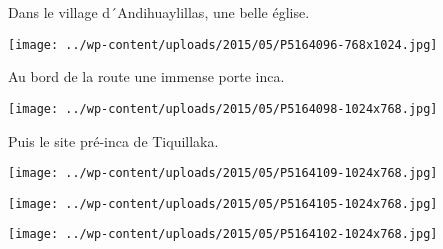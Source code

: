  \newline
 Dans le village d´Andihuaylillas, une belle église. \newline
 \newline
\centerline{\texttt{[image: ../wp-content/uploads/2015/05/P5164096-768x1024.jpg]} } 
 \newline
 Au bord de la route une immense porte inca. \newline
 \newline
\centerline{\texttt{[image: ../wp-content/uploads/2015/05/P5164098-1024x768.jpg]} } 
 \newline
 Puis le site pré-inca de Tiquillaka. \newline
 \newline
\centerline{\texttt{[image: ../wp-content/uploads/2015/05/P5164109-1024x768.jpg]} } 
 \newline
 \newline
\centerline{\texttt{[image: ../wp-content/uploads/2015/05/P5164105-1024x768.jpg]} } 
 \newline
 \newline
\centerline{\texttt{[image: ../wp-content/uploads/2015/05/P5164102-1024x768.jpg]} } 
 \newline

\newpage
 
